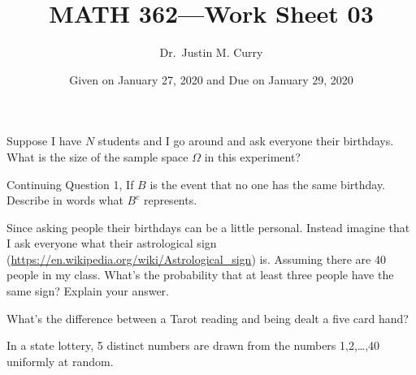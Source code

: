 \documentclass[addpoints,12pt]{exam}
\title{\vspace{-1in} MATH 362---Work Sheet 03}
\date{Given on January 27, 2020 and Due on January 29, 2020}
\author{Dr.~Justin M. Curry}
\begin{document}
\maketitle


\begin{questions}

\question[1] Suppose I have $N$ students and I go around and ask everyone their birthdays. What is the size of the sample space $\Omega$ in this experiment? 

\question[1] Continuing Question 1, If $B$ is the event that no one has the same birthday. Describe in words what $B^c$ represents.

\question[2] Since asking people their birthdays can be a little personal. Instead imagine that I ask everyone what their astrological sign (\url{https://en.wikipedia.org/wiki/Astrological_sign}) is. Assuming there are 40 people in my class. What's the probability that at least three people have the same sign? Explain your answer.

\question[1] What's the difference between a Tarot reading and being dealt a five card hand?

\question[3] In a state lottery, 5 distinct numbers are drawn from the numbers 1,2,\ldots,40 uniformly at random.
\noaddpoints
{}
\end{questions}
\end{document}
